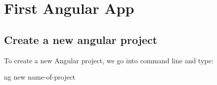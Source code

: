 \chapter{First Angular App}
\section{Create a new angular project}
To create a new Angular project, we go into command line and type:

ng new name-of-project
